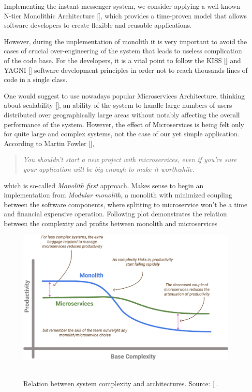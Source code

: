 Implementing the instant messenger system, we consider applying a well-known N-tier
Monolithic Architecture [\cite{bucchiarone2018monolithic}], which provides a time-proven model that allows software
developers to create flexible and reusable applications.

However, during the implementation of monolith it is very important to avoid the cases of crucial over-engineering
of the system that leads to useless complication of the code base.
For the developers, it is a vital point to follow the KISS [\cite{alwin2016kiss}] and YAGNI [\cite{da2018evolution}]
software development principles in order not to reach thousands lines of code in a single class.

One would suggest to use nowadays popular Microservices Architecture, thinking about scalability [\cite{brataas2004exploring}],
an ability of the system to handle large numbers of users distributed over geographically large areas without
notably affecting the overall performance of the system.
However, the effect of Microservices is being felt only for quite large and complex systems,
not the case of our yet simple application.
According to Martin Fowler [\cite{fowler2015monolith}],
\begin{quote}
    \textit{You shouldn't start a new project with microservices, even if you're sure your application will be big enough to
    make it worthwhile.}
\end{quote}
which is so-called \textit{Monolith first} approach.
Makes sense to begin an implementation from \textit{Modular monolith}, a monolith with minimized coupling between the
software components, where splitting to microservice won't be a time and financial expensive operation.
Following plot demonstrates the relation between the complexity and profits between monolith and microservices

\begin{figure}[H]
    \centering
    \includegraphics[width=1\textwidth]{Pictures/02_Monolith_and_Microservices_complexity}
    ~\caption{Relation between system complexity and architectures. Source: [\cite{fowler2015microsevices}].}
    \label{fig:monolith_vs_microservice}
\end{figure}

